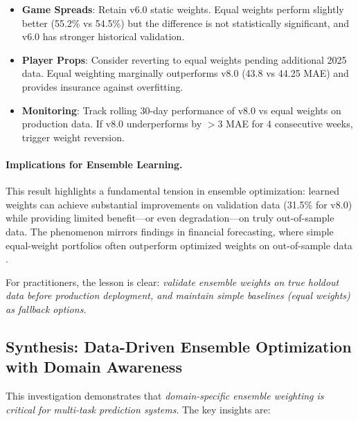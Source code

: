 \begin{itemize}
  \item \textbf{Game Spreads}: Retain v6.0 static weights. Equal weights perform slightly better (55.2\% vs 54.5\%) but the difference is not statistically significant, and v6.0 has stronger historical validation.

  \item \textbf{Player Props}: Consider reverting to equal weights pending additional 2025 data. Equal weighting marginally outperforms v8.0 (43.8 vs 44.25 MAE) and provides insurance against overfitting.

  \item \textbf{Monitoring}: Track rolling 30-day performance of v8.0 vs equal weights on production data. If v8.0 underperforms by $>$3 MAE for 4 consecutive weeks, trigger weight reversion.
\end{itemize}

\paragraph{Implications for Ensemble Learning.}
This result highlights a fundamental tension in ensemble optimization: learned weights can achieve substantial improvements on validation data (31.5\% for v8.0) while providing limited benefit---or even degradation---on truly out-of-sample data. The phenomenon mirrors findings in financial forecasting, where simple equal-weight portfolios often outperform optimized weights on out-of-sample data \citep{demiguel2009optimal}.

For practitioners, the lesson is clear: \emph{validate ensemble weights on true holdout data before production deployment, and maintain simple baselines (equal weights) as fallback options.}

\subsection{Synthesis: Data-Driven Ensemble Optimization with Domain Awareness}
\label{subsec:dirichlet-synthesis}

This investigation demonstrates that \emph{domain-specific ensemble weighting is critical for multi-task prediction systems}. The key insights are:


